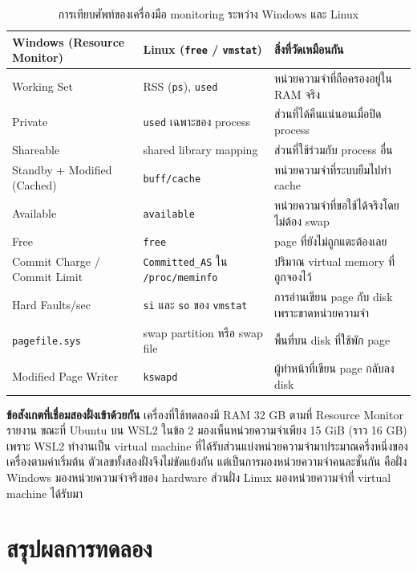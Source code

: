 \documentclass[a4paper,11pt]{article}
\newcommand{\code}[1]{\texttt{#1}}
\begin{document}
\begin{table}[H]
\centering\small
\caption{การเทียบศัพท์ของเครื่องมือ monitoring ระหว่าง Windows และ Linux}
\begin{tabular}{@{}p{4.2cm}p{4.5cm}p{7.0cm}@{}}
\toprule
\textbf{Windows (Resource Monitor)} & \textbf{Linux (\code{free} / \code{vmstat})} & \textbf{สิ่งที่วัดเหมือนกัน} \\
\midrule
Working Set & RSS (\code{ps}), \code{used} & หน่วยความจำที่ถือครองอยู่ใน RAM จริง \\
Private & \code{used} เฉพาะของ process & ส่วนที่ได้คืนแน่นอนเมื่อปิด process \\
Shareable & shared library mapping & ส่วนที่ใช้ร่วมกับ process อื่น \\
Standby + Modified (Cached) & \code{buff/cache} & หน่วยความจำที่ระบบยืมไปทำ cache \\
Available & \code{available} & หน่วยความจำที่ขอใช้ได้จริงโดยไม่ต้อง swap \\
Free & \code{free} & page ที่ยังไม่ถูกแตะต้องเลย \\
Commit Charge / Commit Limit & \code{Committed\_AS} ใน \code{/proc/meminfo} & ปริมาณ virtual memory ที่ถูกจองไว้ \\
Hard Faults/sec & \code{si} และ \code{so} ของ \code{vmstat} & การอ่านเขียน page กับ disk เพราะขาดหน่วยความจำ \\
\code{pagefile.sys} & swap partition หรือ swap file & พื้นที่บน disk ที่ใช้พัก page \\
Modified Page Writer & \code{kswapd} & ผู้ทำหน้าที่เขียน page กลับลง disk \\
\bottomrule
\end{tabular}
\end{table}

\textbf{ข้อสังเกตที่เชื่อมสองฝั่งเข้าด้วยกัน} เครื่องที่ใช้ทดลองมี RAM 32 GB ตามที่ Resource Monitor รายงาน ขณะที่ Ubuntu บน WSL2 ในข้อ 2 มองเห็นหน่วยความจำเพียง 15 GiB (ราว 16 GB) เพราะ WSL2 ทำงานเป็น virtual machine ที่ได้รับส่วนแบ่งหน่วยความจำมาประมาณครึ่งหนึ่งของเครื่องตามค่าเริ่มต้น ตัวเลขทั้งสองฝั่งจึงไม่ขัดแย้งกัน แต่เป็นการมองหน่วยความจำคนละชั้นกัน คือฝั่ง Windows มองหน่วยความจำจริงของ hardware ส่วนฝั่ง Linux มองหน่วยความจำที่ virtual machine ได้รับมา

\section*{สรุปผลการทดลอง}
\end{document}
